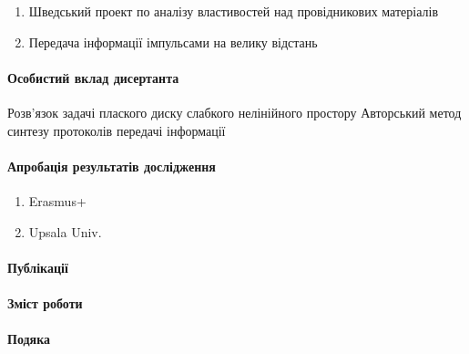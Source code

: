 \begin{enumerate} 
	\item Шведський проект по аналізу властивостей над провідникових матеріалів
	\item Передача інформації імпульсами на велику відстань
\end{enumerate} 

\paragraph{Особистий вклад дисертанта}

Розв'язок задачі плаского диску слабкого нелінійного простору
Авторський метод синтезу протоколів передачі інформації

\paragraph{Апробація результатів дослідження}

\begin{enumerate} 
	\item Erasmus+
	\item Upsala Univ.
\end{enumerate} 

\paragraph{Публікації}

\paragraph{Зміст роботи}

\paragraph{Подяка}
